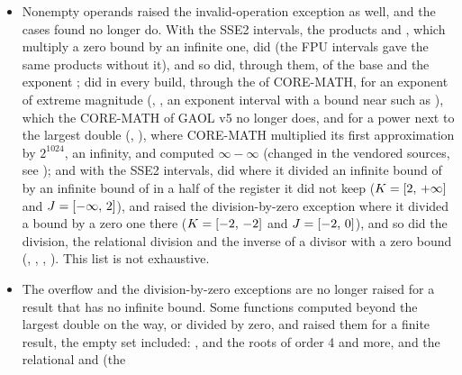 \begin{itemize}
  vectorize them and took as long as before. A choice the program makes on a
  relation, , and a loop of relations other
  than those of  are not known to raise
  the exception, but nothing keeps a compiler from compiling them
  so.\newinvfive
\item Nonempty operands raised the invalid-operation exception as well, and
  the cases found no longer do. With the SSE2 intervals, the products
   and
  , which multiply a zero bound by an
  infinite one, did (the FPU intervals gave the same products without it),
  and so did, through them,  of the base  and the
  exponent ;  did in every
  build, through the  of CORE-MATH, for an exponent of extreme
  magnitude (,
  , an exponent interval with a
  bound near  such as ), which the
  CORE-MATH of GAOL v5 no longer does, and for a power next to the largest
  double (,
  ), where CORE-MATH
  multiplied its first approximation by $2^{1024}$, an infinity, and computed
  $\infty-\infty$ (changed in the vendored sources, see );
  and with the SSE2 intervals,  did where it divided
  an infinite bound of  by an infinite bound of  in a half of
  the register it did not keep ($K=[2,\,+\infty]$ and
  $J=[-\infty,\,2]$), and raised the division-by-zero exception where it
  divided a bound by a zero one there ($K=[-2,\,-2]$ and $J=[-2,\,0]$),
  and so did the division, the relational division and the inverse of a
  divisor with a zero bound (,
  , ,
  ). This list is not exhaustive.\newinvfive
\item The overflow and the division-by-zero exceptions are no longer raised
  for a result that has no infinite bound. Some functions computed beyond the
  largest double on the way, or divided by zero, and raised them for a finite
  result, the empty set included: ,
   and the roots of order 4 and more,
  and the relational  and  (the

\end{itemize}
